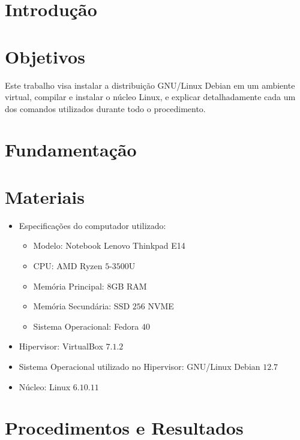 \documentclass[
	12pt,				%
	oneside,   	        %
	a4paper,			%
	english,			%
	french,				%
	spanish,			%
	brazil,				%
	]{pacotes/abntex2}
\begin{document}
\makeatletter
\renewcommand{\chapter}{\@gobbletwo}
\makeatother

\section{Introdução}
\label{sec:introducao}

\section{Objetivos}
\label{sec:objetivos}

Este trabalho visa instalar a distribuição GNU/Linux Debian em um ambiente virtual, compilar e instalar o núcleo Linux, e explicar detalhadamente cada um dos comandos utilizados durante todo o procedimento.

\section{Fundamentação}
\label{sec:fundamentacao}

\section{Materiais}
\label{sec:materiais}

\begin{itemize}
  \item Especificações do computador utilizado:
  \begin{itemize}
    \item Modelo: Notebook Lenovo Thinkpad E14
    \item CPU: AMD Ryzen $5$-$3500$U
    \item Memória Principal: $8$GB RAM
    \item Memória Secundária: SSD $256$ NVME
    \item Sistema Operacional: Fedora $40$
  \end{itemize}
  \item Hipervisor: VirtualBox $7.1.2$
  \item Sistema Operacional utilizado no Hipervisor: GNU/Linux Debian $12.7$
  \item Núcleo: Linux $6.10.11$
\end{itemize}

\section{Procedimentos e Resultados}
\label{sec:procedimentos}
\end{document}
